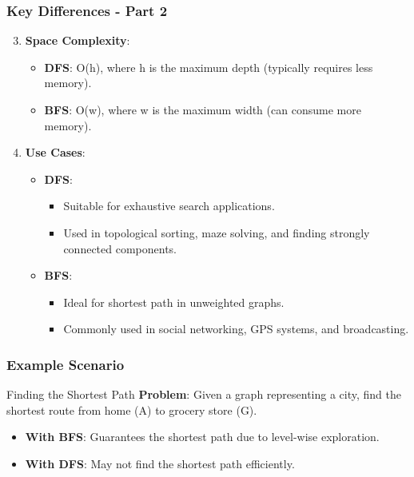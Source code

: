 \documentclass[aspectratio=169]{beamer}
\begin{document}
\begin{frame}
    \frametitle{Key Differences - Part 2}
    \begin{enumerate}
        \setcounter{enumi}{2}
        \item \textbf{Space Complexity}:
        \begin{itemize}
            \item \textbf{DFS}: O(h), where h is the maximum depth (typically requires less memory).
            \item \textbf{BFS}: O(w), where w is the maximum width (can consume more memory).
        \end{itemize}
        
        \item \textbf{Use Cases}:
        \begin{itemize}
            \item \textbf{DFS}:
            \begin{itemize}
                \item Suitable for exhaustive search applications.
                \item Used in topological sorting, maze solving, and finding strongly connected components.
            \end{itemize}
            \item \textbf{BFS}:
            \begin{itemize}
                \item Ideal for shortest path in unweighted graphs.
                \item Commonly used in social networking, GPS systems, and broadcasting.
            \end{itemize}
        \end{itemize}
    \end{enumerate}
\end{frame}

\begin{frame}
    \frametitle{Example Scenario}
    \begin{block}{Finding the Shortest Path}
        \textbf{Problem}: Given a graph representing a city, find the shortest route from home (A) to grocery store (G).
        \begin{itemize}
            \item \textbf{With BFS}: Guarantees the shortest path due to level-wise exploration.
            \item \textbf{With DFS}: May not find the shortest path efficiently.
        \end{itemize}
    \end{block}
\end{frame}
\end{document}
